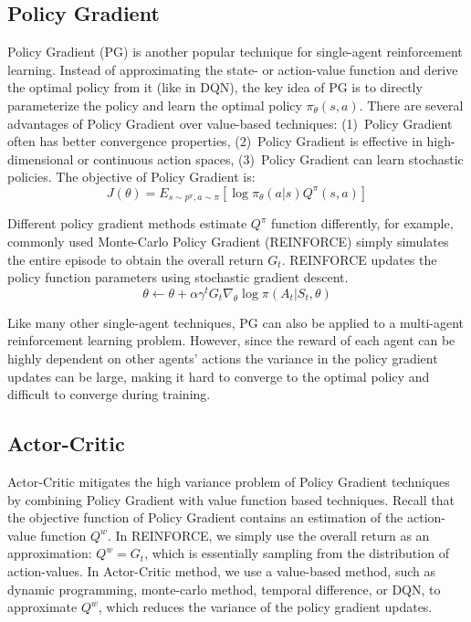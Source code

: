 \subsection{Policy Gradient}

Policy Gradient (PG) is another popular technique for single-agent
reinforcement learning. Instead of approximating the state- or action-value
function and derive the optimal policy from it (like in DQN), the key idea of
PG is to directly parameterize the policy and learn the optimal policy
$\pi_\theta (s,a)$. There are several advantages of Policy Gradient over
value-based techniques: (1)~Policy Gradient often has better convergence
properties, (2)~Policy Gradient is effective in high-dimensional or continuous
action spaces, (3)~Policy Gradient can learn stochastic policies. The
objective of Policy Gradient is:
\begin{equation}
J(\theta) = E_{s\sim p^\pi, a\sim \pi} [\log \pi_\theta (a|s) Q^\pi(s,a)]
\end{equation}

Different policy gradient methods estimate $Q^\pi$ function differently, for
example, commonly used Monte-Carlo Policy Gradient (REINFORCE) simply
simulates the entire episode to obtain the overall return $G_t$. REINFORCE
updates the policy function parameters using stochastic gradient descent.
\begin{equation}
\theta \leftarrow \theta
	+ \alpha \gamma^t G_t \nabla_\theta \log \pi (A_t|S_t, \theta)
\end{equation}

Like many other single-agent techniques, PG can also be applied to a
multi-agent reinforcement learning problem. However, since the reward of each
agent can be highly dependent on other agents' actions the variance in the
policy gradient updates can be large, making it hard to converge to the
optimal policy and difficult to converge during training.


\subsection{Actor-Critic}

Actor-Critic mitigates the high variance problem of Policy Gradient techniques
by combining Policy Gradient with value function based techniques. Recall that
the objective function of Policy Gradient contains an estimation of the
action-value function $Q^w$. In REINFORCE, we simply use the overall return as
an approximation: $Q^w = G_t$, which is essentially sampling from the
distribution of action-values. In Actor-Critic method, we use a value-based
method, such as dynamic programming, monte-carlo method, temporal difference,
or DQN, to approximate $Q^w$, which reduces the variance of the policy
gradient updates.


